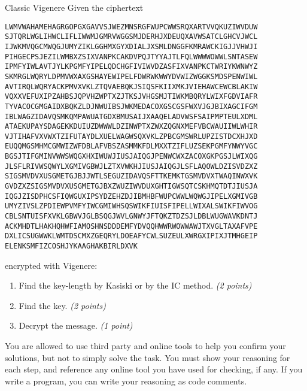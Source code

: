 \documentclass{homework}
\begin{document}
\begin{task}{Classic Vigenere}
  Given the ciphertext
  \begin{Verbatim}
LWMVWAHAMEHAGRGOPGXGAVVSJWEZMNSRGFWUPCWWSRQXARTVVQKUZIWVDUW
SJTQRLWGLIHWCLIFLIWWMJGMRVWGGSMJDERHJXDEUQXAVWSATCLGHCVJWCL
IJWKMVQGCMWQGJUMYZIKLGGHMXGYXDIALJXSMLDNGGFKMRAWCKIGJJVHWJI
PIHGECPSJEZILWMBXZSIXVANPKCAKDVPQJTYYAJTLFQLWWWWOWWLSNTASEW
IPMFYIWLAVTJYLKPGMFYIPELQDCHGFIVIWVDZASFIXVANPKCTWRIYKWNWYZ
SKMRGLWQRYLDPMVWXAXGSHAYEWIPELFDWRWKWWYDVWIZWGGKSMDSPENWIWL
AVTIRQLWQRYACKPMVXVKLZTQVAEBQKJSIQSFKIIXMKJVIEHAWCEWCBLAKIW
VQXXVEFUXIPZAHBSJQPVHZWPTXZJTKSJVHGSMJTIWKMBQRYLWIXFGDVIAFR
TYVACOCGMGAIDXBQKZLDJNWUIBSJWKMEDACOXGSCGSFWXVJGJBIXAGCIFGM
IBLWAGZIDAVQSMKQMPAWUATGDXBMUSAIJXAAQELADVWSFSAIPMPTEULXDML
ATAEKUPAYSDAGEKKDUIUZDWWWLDZINWPTXZWXZQGNXMEFVBCWAUIIWLWHIR
VJTIHAFVXVWXTZIFUTAYDLXUELWAGWSQXVKLZPBCGMSWRLUPZISTDCXHJXD
EUQQMGSMHMCGMWIZWFDBLAFVBSZASMMKFDLMXXTZIFLUZSEKPGMFYNWYVGC
BGSJTIFGMINVWWSWQGXHXIWUWJIUSJAIQGJPENWCWXZACOXGKPGSJLWIXQG
JLSFLRIVWSQWYLXGMIVGBWJLZTXVWKHJIUSJAIQGJLSFLAQOWLDZISVDZXZ
SIGSMVDVXUSGMETGJBJJWTLSEGUZIDAVQSFTTKEMKTGSMVDVXTWAQINWXVK
GVDZXZSIGSMVDVXUSGMETGJBXZWUZIWVDUXGHTIGWSQTCSKHMQTDTJIUSJA
IQGJZISDPHCSFIQWGUXIPSYDZEHZDJIBMHBFWUPCWWLWQWGJIPELXGMIVGB
UMYZIVSLZPDIEWPVMFYIWCGMIWHSQSWIKFIUISFIPELLWIXALSWIKFIWVOG
CBLSNTUISFXVKLGBWVJGLBSQGJWVLGNWYJFTQKZTDZSJLDBLWUGWAVKDNTJ
ACKMHDTLHAKHQHWFIAMOSHNSDDDEMFYDVQQHWWRWOWWAWJTXVGLTAXAFVPE
DXLICSUGWWKLWMTDSCMXZGEQRYLDOEAFYCWLSUZEULXWRGXIPIXJTMHGEIP
ELENKSMFIZCOSHJYKAAGHAKBIRLDXVK
  \end{Verbatim}
  encrypted with Vigenere:
  \begin{enumerate}
    \item Find the key-length by Kasiski or by the IC method. \textit{(2 points)}
    \item Find the key. \textit{(2 points)}
    \item Decrypt the message. \textit{(1 point)}
  \end{enumerate}

  You are allowed to use third party and online tools to help you confirm your solutions, but not to simply solve the task.
  You must show your reasoning for each step, and reference any online tool you have used for checking, if any.
  If you write a program, you can write your reasoning as code comments.
\end{task}
\end{document}
